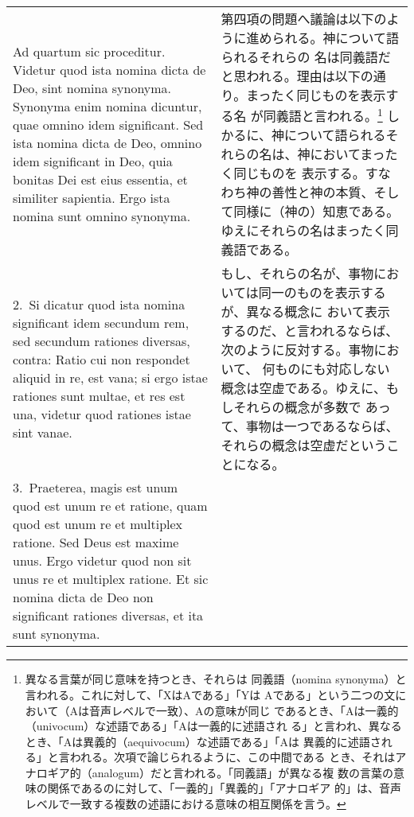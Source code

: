 \documentclass[10pt]{jsarticle}
\begin{document}
\begin{longtable}{p{21em}p{21em}}

{\sc Ad quartum sic proceditur}. Videtur quod
ista nomina dicta de Deo, sint nomina synonyma. Synonyma enim nomina
dicuntur, quae omnino idem significant. Sed ista nomina dicta de Deo,
omnino idem significant in Deo, quia bonitas Dei est eius essentia, et
similiter sapientia. Ergo ista nomina sunt omnino synonyma.

&

第四項の問題へ議論は以下のように進められる。神について語られるそれらの
名は同義語だと思われる。理由は以下の通り。まったく同じものを表示する名
が同義語と言われる。\footnote{異なる言葉が同じ意味を持つとき、それらは
同義語（nomina synonyma）と言われる。これに対して、「XはAである」「Yは
Aである」という二つの文において（Aは音声レベルで一致）、Aの意味が同じ
であるとき、「Aは一義的（univocum）な述語である」「Aは一義的に述語され
る」と言われ、異なるとき、「Aは異義的（aequivocum）な述語である」「Aは
異義的に述語される」と言われる。次項で論じられるように、この中間である
とき、それはアナロギア的（analogum）だと言われる。「同義語」が異なる複
数の言葉の意味の関係であるのに対して、「一義的」「異義的」「アナロギア
的」は、音声レベルで一致する複数の述語における意味の相互関係を言う。}
しかるに、神について語られるそれらの名は、神においてまったく同じものを
表示する。すなわち神の善性と神の本質、そして同様に（神の）知恵である。
ゆえにそれらの名はまったく同義語である。

\\

2.~Si dicatur quod ista nomina significant idem secundum rem, sed
secundum rationes diversas, contra: Ratio cui non respondet aliquid in
re, est vana; si ergo istae rationes sunt multae, et res est una,
videtur quod rationes istae sint vanae.

&

もし、それらの名が、事物においては同一のものを表示するが、異なる概念に
おいて表示するのだ、と言われるならば、次のように反対する。事物において、
何ものにも対応しない概念は空虚である。ゆえに、もしそれらの概念が多数で
あって、事物は一つであるならば、それらの概念は空虚だということになる。

\\

3.~{\sc Praeterea}, magis est unum quod est unum re et ratione, quam
quod est unum re et multiplex ratione. Sed Deus est maxime unus. Ergo
videtur quod non sit unus re et multiplex ratione. Et sic nomina dicta
de Deo non significant rationes diversas, et ita sunt synonyma.


\end{longtable}
\end{document}
